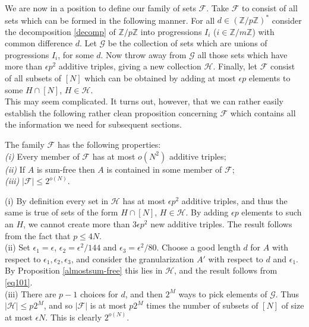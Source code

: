 \documentclass[a4paper,12pt]{article}
\begin{document}
We are now in a position to define our family of sets $\mathcal{F}$. Take $\mathcal{F}$ to consist of all sets which can be formed in the following manner. For all $d \in (\mathbb{Z}/p\mathbb{Z})^{\ast}$ consider the decomposition \eqref{decomp} of $\mathbb{Z}/p\mathbb{Z}$ into progressions $I_i$ ($i \in \mathbb{Z}/m\mathbb{Z}$) with common difference $d$. Let $\mathcal{G}$ be the collection of sets which are unions of progressions $I_i$, for some $d$. Now throw away from $\mathcal{G}$ all those sets which have more than $\epsilon p^2$ additive triples, giving a new collection $\mathcal{H}$. Finally, let $\mathcal{F}$ consist of all subsets of $[N]$ which can be obtained by adding at most $\epsilon p$ elements to some $H \cap [N]$, $H \in \mathcal{H}$.\\[11pt]
This may seem complicated. It turns out, however, that we can rather easily establish the following rather clean proposition concerning $\mathcal{F}$ which contains all the information we need for subsequent sections.
\begin{propositionenv}\label{prop462}
The family $\mathcal{F}$ has the following properties:\\
\emph{(i)} Every member of $\mathcal{F}$ has at most $o(N^2)$ additive triples;\\
\emph{(ii)} If $A$ is sum-free then $A$ is contained in some member of $\mathcal{F}$;\\
\emph{(iii)} $|\mathcal{F}| \leq 2^{o(N)}$.
\end{propositionenv}
\proof (i) By definition every set in $\mathcal{H}$ has at most $\epsilon p^2$ additive triples, and thus the same is true of sets of the form $H \cap [N]$, $H \in \mathcal{H}$. By adding $\epsilon p$ elements to such an $H$, we cannot create more than $3\epsilon p^2$ new additive triples. The result follows from the fact that $p \leq 4N$.\\
(ii) Set $\epsilon_1 = \epsilon$, $\epsilon_2 = \epsilon^2/144$ and $\epsilon_3 = \epsilon^2/80$. Choose a good length $d$ for $A$ with respect to $\epsilon_1,\epsilon_2,\epsilon_3$, and consider the granularization $A'$ with respect to $d$ and $\epsilon_1$. By Proposition \ref{almostsum-free} this lies in $\mathcal{H}$, and the result follows from \eqref{eq101}. \\
(iii) There are $p-1$ choices for $d$, and then $2^M$ ways to pick elements of $\mathcal{G}$. Thus $|\mathcal{H}| \leq p2^M$, and so $|\mathcal{F}|$ is at most $p2^M$ times the number of subsets of $[N]$ of size at most $\epsilon N$. This is clearly $2^{o(N)}$.
\end{document}

